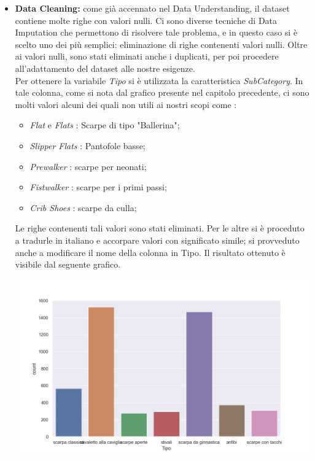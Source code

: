 \documentclass[a4paper, 11pt, oneside]{report}
\begin{document}
                \begin{itemize}
                    \item \textbf{Data Cleaning:} come già accennato nel Data Understanding, il dataset contiene molte righe con valori nulli.
                    Ci sono diverse tecniche di Data Imputation che permettono di risolvere tale problema,
                    e in questo caso si è scelto uno dei più semplici: eliminazione di righe contenenti valori nulli.
                    Oltre ai valori nulli, sono stati eliminati anche i duplicati, per poi procedere all'adattamento
                    del dataset alle nostre esigenze.\\
                    Per ottenere la variabile \emph{Tipo} si è utilizzata la caratteristica \emph{SubCategory}.
                    In tale colonna, come si nota dal grafico presente nel capitolo precedente, ci sono molti valori
                    alcuni dei quali non utili ai nostri scopi come :
                    \begin{itemize}
                        \item \emph{Flat} e \emph{Flats} : Scarpe di tipo "Ballerina";
                        \item \emph{Slipper Flats} : Pantofole basse;
                        \item \emph{Prewalker} : scarpe per neonati;
                        \item \emph{Fistwalker} : scarpe per i primi passi;
                        \item \emph{Crib Shoes} : scarpe da culla;
                    \end{itemize}
                    Le righe contenenti tali valori sono stati eliminati.
                    Per le altre si è proceduto a tradurle in italiano e accorpare valori con significato simile;
                    si provveduto anche a modificare il nome della colonna in Tipo.
                    Il risultato ottenuto è visibile dal seguente grafico.
                    \begin{center}
                        \includegraphics[scale=0.3]{countTipoShoes}

\end{center}
\end{itemize}
\end{document}
